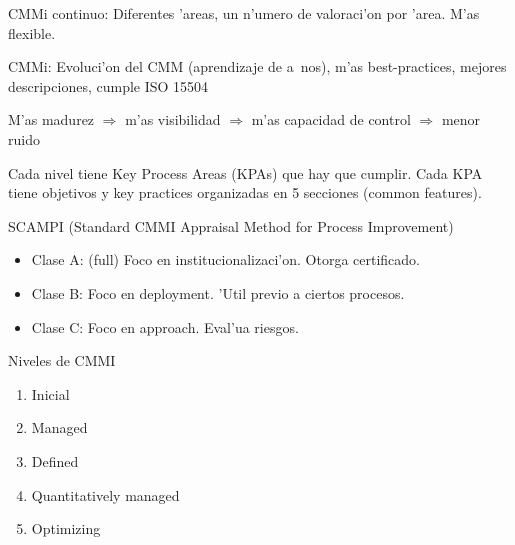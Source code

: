 \documentclass[a4paper,spanish]{article}
\begin{document}
CMMi continuo: Diferentes 'areas, un n'umero de valoraci'on por 'area. 
	M'as flexible.

CMMi: Evoluci'on del CMM (aprendizaje de a~nos), m'as best-practices, mejores
	descripciones, cumple ISO 15504

M'as madurez $\Rightarrow$ m'as visibilidad $\Rightarrow$ m'as capacidad de
	control $\Rightarrow$ menor ruido
	
Cada nivel tiene Key Process Areas (KPAs) que hay que cumplir. Cada KPA tiene
	objetivos y key practices organizadas en 5 secciones (common features).
	
SCAMPI (Standard CMMI Appraisal Method for Process Improvement)
\begin{itemize}
\item Clase A: (full) Foco en institucionalizaci'on. Otorga certificado.
\item Clase B: Foco en deployment. 'Util previo a ciertos procesos.
\item Clase C: Foco en approach. Eval'ua riesgos.
\end{itemize}

Niveles de CMMI
\begin{enumerate}
\item Inicial
\item Managed
\item Defined
\item Quantitatively managed
\item Optimizing
\end{enumerate}

\label{theend}
\end{document}
